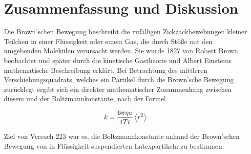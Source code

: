 \section{Zusammenfassung und Diskussion}

Die Brown'schen Bewegung beschreibt die zufälligen Zickzackbewebungen kleiner Teilchen in einer Flüssigkeit oder einem Gas, die durch Stöße mit den umgebenden Molekülen verursacht werden. Sie wurde 1827 von Robert Brown beobachtet und später durch die kinetische Gastheorie und Albert Einsteins mathematische Beschreibung erklärt. Bei Betrachtung des mittleren Verschiebungsquadrats, welches ein Partikel durch die Brown'sche Bewegung zurücklegt ergibt sich ein direkter mathematischer Zusammenhang zwischen diesem und der Boltzmannkonstante, nach der Formel

\begin{gather*}
  k = \frac{6\pi\eta a}{4 T t} \expval{r^2}.
\end{gather*}

Ziel von Versuch 223 war es, die Boltzmannkonstante anhand der Brown'schen Bewegung von in Flüssigkeit suspendierten Latexpartikeln zu bestimmen. 